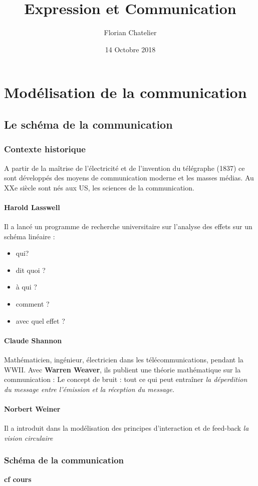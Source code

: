 \documentclass[a4paper,11pt]{report}
\title{Expression et Communication}
\author{Florian Chatelier}
\date{14 Octobre 2018}
\begin{document}
\part{Modélisation de la communication}
\tableofcontents
\chapter{Le schéma de la communication}
\section{Contexte historique}
A partir de la maîtrise de l'électricité et de l'invention du télégraphe (1837) ce sont développés des moyens de communication moderne et les masses médias.
Au XXe siècle sont nés aux US, les sciences de la communication.

\subsection{Harold Lasswell}
Il a lancé un programme de recherche universitaire sur l'analyse des effets sur un schéma linéaire :
\begin{itemize}
    \item qui?
    \item dit quoi ?
    \item à qui ?
    \item comment ?
    \item avec quel effet ?
\end{itemize}

\subsection{Claude Shannon}
Mathématicien, ingénieur, électricien dans les télécommunications, pendant la WWII.
Avec \textbf{Warren Weaver}, ils publient une théorie mathématique sur la communication :
Le concept de bruit : tout ce qui peut entraîner \textit{la déperdition du message entre l'émission et la réception du message.}

\subsection{Norbert Weiner}
Il a introduit dans la modélisation des principes d'interaction et de feed-back \textit{la vision circulaire}

\section{Schéma de la communication}
\textbf{cf cours}
\end{document}
